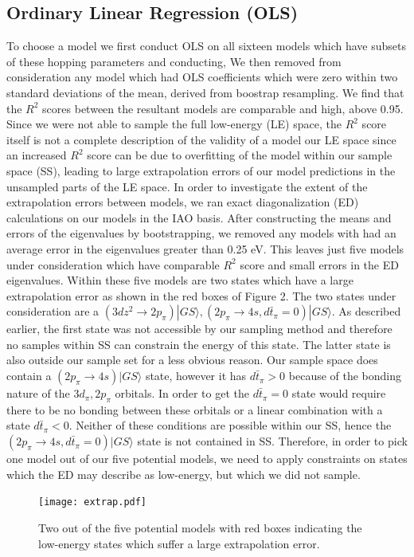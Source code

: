 \documentclass{article}
\begin{document}
\subsection{Ordinary Linear Regression (OLS)}
To choose a model we first conduct OLS on all sixteen models which have subsets of these hopping parameters and conducting, We then removed from consideration any model which had OLS coefficients which were zero within two standard deviations of the mean, derived from boostrap resampling. We find that the $R^2$ scores between the resultant models are comparable and high, above 0.95. Since we were not able to sample the full low-energy (LE) space, the $R^2$ score itself is not a complete description of the validity of a model our LE space since an increased $R^2$ score can be due to overfitting of the model within our sample space (SS), leading to large extrapolation errors of our model predictions in the unsampled parts of the LE space. In order to investigate the extent of the extrapolation errors between models, we ran exact diagonalization (ED) calculations on our models in the IAO basis. After constructing the means and errors of the eigenvalues by bootstrapping, we removed any models with had an average error in the eigenvalues greater than 0.25 eV. This leaves just five models under consideration which have comparable $R^2$ score and small errors in the ED eigenvalues. Within these five models are two states which have a large extrapolation error as shown in the red boxes of Figure 2. The two states under consideration are a $(3dz^2 \rightarrow 2p_\pi)|GS\rangle, (2p_\pi \rightarrow 4s, d\bar{t}_\pi = 0)|GS\rangle$. As described earlier, the first state was not accessible by our sampling method and therefore no samples within SS can constrain the energy of this state. The latter state is also outside our sample set for a less obvious reason. Our sample space does contain a $(2p_\pi \rightarrow 4s)|GS\rangle$ state, however it has $d\bar{t}_\pi > 0$ because of the bonding nature of the $3d_\pi, 2p_\pi$ orbitals. In order to get the $d\bar{t}_\pi = 0$ state would require there to be no bonding between these orbitals or a linear combination with a state $d\bar{t}_\pi < 0$. Neither of these conditions are possible within our SS, hence the $(2p_\pi \rightarrow 4s, d\bar{t}_\pi = 0)|GS\rangle$ state is not contained in SS. Therefore, in order to pick one model out of our five potential models, we need to apply constraints on states which the ED may describe as low-energy, but which we did not sample.

\begin{figure}[H]
\centering
\texttt{[image: extrap.pdf]}
\label{fig:extrap}
\caption{Two out of the five potential models with red boxes indicating the low-energy states which suffer a large extrapolation error.}
\end{figure}
\end{document}
